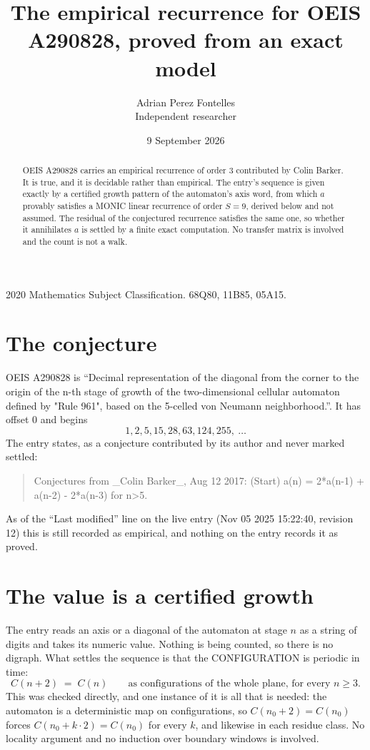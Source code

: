 \documentclass[11pt,a4paper]{article}
\title{The empirical recurrence for OEIS A290828, proved from an exact model}
\author{Adrian Perez Fontelles\\ \small Independent researcher}
\date{9 September 2026}
\theoremstyle{plain}
\theoremstyle{definition}
\begin{document}
\maketitle

\begin{abstract}
OEIS A290828 carries an empirical recurrence of order $3$ contributed by Colin Barker. It is true, and it is
decidable rather than empirical. The entry's sequence is given exactly by a certified growth pattern of the automaton's axis word, from
which $a$ provably satisfies a MONIC linear recurrence of order $S=9$, derived below and not
assumed. The residual of the conjectured recurrence satisfies the same one, so whether it
annihilates $a$ is settled by a finite exact computation. No transfer matrix is involved and
the count is not a walk.
\end{abstract}

\noindent\small 2020 Mathematics Subject Classification. 68Q80, 11B85, 05A15.\normalsize

\section{The conjecture}

OEIS A290828 is ``Decimal representation of the diagonal from the corner to the origin of the n-th stage of growth of the two-dimensional cellular automaton defined by "Rule 961", based on the 5-celled von Neumann neighborhood.''. It has offset $0$ and begins
\[
1, 2, 5, 15, 28, 63, 124, 255,\ \dots
\]
The entry states, as a conjecture contributed by its author and never marked settled:
\begin{quote}
Conjectures from \_Colin Barker\_, Aug 12 2017: (Start) a(n) = 2*a(n-1) + a(n-2) - 2*a(n-3) for n>5.
\end{quote}
As of the ``Last modified'' line on the live entry (Nov 05 2025 15:22:40, revision 12)
this is still recorded as empirical, and nothing on the entry records it as proved.

\section{The value is a certified growth}

The entry reads an axis or a diagonal of the automaton at stage $n$ as a string of digits and
takes its numeric value. Nothing is being counted, so there is no digraph. What settles the
sequence is that the CONFIGURATION is periodic in time:
\[
C(n+2)\;=\;C(n)\qquad\text{as configurations of the whole plane, for every } n\ge 3.
\]
This was checked directly, and one instance of it is all that is needed: the automaton is a
deterministic map on configurations, so $C(n_0+2)=C(n_0)$ forces $C(n_0+k\cdot2)=C(n_0)$ for
every $k$, and likewise in each residue class. No locality argument and no induction over
boundary windows is involved.
\end{document}
